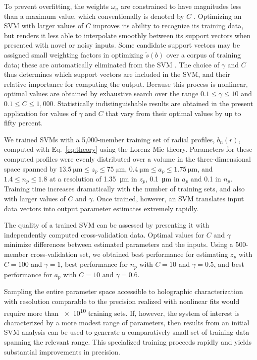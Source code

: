 \documentclass[10pt,letterpaper]{article}
\begin{document}
To prevent overfitting, the weights $\omega_n$ are constrained to
have magnitudes less than a maximum value, which conventionally is denoted by
$C$ \cite{smola04}.
Optimizing an SVM with larger values of $C$ improves its ability to recognize its
training data, but renders it less able to interpolate smoothly
between its support vectors when presented with novel or noisy inputs.
Some candidate support vectors may be assigned small weighting
factors in optimizing $\tilde{s}(b)$ over a corpus of training data;
these are automatically eliminated from the SVM \cite{smola04}.
The choice of $\gamma$ and $C$ thus determines which support 
vectors are included in the SVM, and their relative importance for computing the output. 
Because this process is nonlinear, optimal values are obtained by
exhaustive search over the range $0.1 \leq \gamma \leq 10$ and
$0.1 \leq C \leq 1,000$.
Statistically indistinguishable results are obtained in the present application 
for values of $\gamma$ and $C$ that vary from their optimal values by
up to fifty percent. 

We trained SVMs with a 5,000-member training set of radial profiles,
$b_n(r)$, computed with Eq.~\eqref{eq:theory} using the Lorenz-Mie
theory.
Parameters for these computed profiles were evenly distributed over a volume in
the three-dimensional space spanned by
$\SI{13.5}{\um} \leq z_p \leq \SI{75}{\um}$,
$\SI{0.4}{\um} \leq a_p \leq \SI{1.75}{\um}$, and
$1.4 \leq n_p \leq 1.8$ at a resolution of
\SI{1.35}{\um} in $z_p$, 
\SI{0.1}{\um} in $a_p$ and 0.1 in $n_p$.
Training time increases dramatically with 
the number of training sets, and also with larger values of $C$ and $\gamma$.
Once trained, however, an SVM translates input data vectors into 
output parameter estimates extremely rapidly.

The quality of a trained SVM can be assessed by presenting
it with independently computed cross-validation data.
Optimal values for $C$ and $\gamma$ minimize differences
between estimated parameters and the inputs.
Using a 500-member cross-validation set, we obtained
best performance for estimating $z_p$
with $C = 100$ and $\gamma = 1$, best performance
for $n_p$ with $C = 10$ and $\gamma = 0.5$, and
best performance for $a_p$ with $C = 10$ and $\gamma = 0.6$.

Sampling the entire parameter space accessible to
holographic characterization with resolution
comparable to the precision realized with nonlinear fits
\cite{lee07a}
would require more than \num{e10} training sets.
If, however, the system of interest is characterized by a more modest range
of parameters, then results from an initial SVM analysis
can be used to generate a comparatively small set of training data
spanning the relevant range.
This specialized training proceeds rapidly
and yields substantial improvements in precision.
\end{document}
